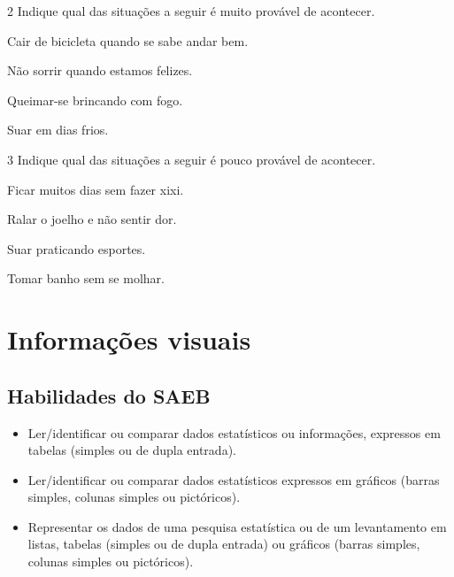 \num{2} Indique qual das situações a seguir é muito provável de acontecer.

\begin{escolha}[itemsep=-5pt]
\item Cair de bicicleta quando se sabe andar bem.

\item Não sorrir quando estamos felizes.

\item Queimar-se brincando com fogo.

\item Suar em dias frios.
\end{escolha}


\num{3} Indique qual das situações a seguir é pouco provável de acontecer.

\begin{escolha}[itemsep=-5pt]
\item Ficar muitos dias sem fazer xixi.

\item Ralar o joelho e não sentir dor.

\item Suar praticando esportes.

\item Tomar banho sem se molhar.
\end{escolha}


\chapter{Informações visuais}


\section*{Habilidades do SAEB}

\begin{itemize}
\item Ler/identificar ou comparar dados estatísticos ou informações, expressos em tabelas (simples ou de dupla entrada).

\item Ler/identificar ou comparar dados estatísticos expressos em gráficos (barras simples, colunas simples ou pictóricos).

\item Representar os dados de uma pesquisa estatística ou de um levantamento
em listas, tabelas (simples ou de dupla entrada) ou gráficos (barras
simples, colunas simples ou pictóricos).
\end{itemize}

